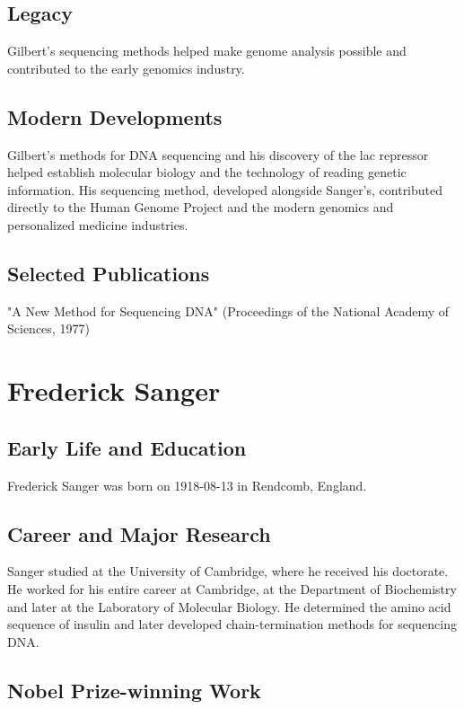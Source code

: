 \subsection*{Legacy}

Gilbert's sequencing methods helped make genome analysis possible and contributed to the early genomics industry.

\subsection*{Modern Developments}

Gilbert's methods for DNA sequencing and his discovery of the lac repressor helped establish molecular biology and the technology of reading genetic information. His sequencing method, developed alongside Sanger's, contributed directly to the Human Genome Project and the modern genomics and personalized medicine industries.

\subsection*{Selected Publications}

"A New Method for Sequencing DNA" (Proceedings of the National Academy of Sciences, 1977)

\clearpage

\section{Frederick Sanger}

\subsection*{Early Life and Education}

Frederick Sanger was born on 1918-08-13 in Rendcomb, England.

\subsection*{Career and Major Research}

Sanger studied at the University of Cambridge, where he received his doctorate. He worked for his entire career at Cambridge, at the Department of Biochemistry and later at the Laboratory of Molecular Biology. He determined the amino acid sequence of insulin and later developed chain-termination methods for sequencing DNA.

\subsection*{Nobel Prize-winning Work}

